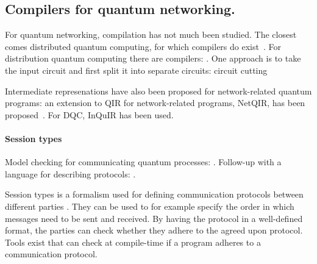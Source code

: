 


\subsection{Compilers for quantum networking.}
For quantum networking, compilation has not much been studied.
The closest comes distributed quantum computing, for which compilers do exist~\cite{ferrari_compiler_2021, chatterjee_qurzon_2022, cuomo_optimized_2023, ferrari_modular_2023}.
For distribution quantum computing there are compilers: \cite{ferrari_compiler_2021, haner_distributed_2021, cuomo_optimized_2023, ferrari_modular_2023}.
One approach is to take the input circuit and first split it into separate circuits: circuit cutting~\cite{chatterjee_qurzon_2022}

Intermediate represenations have also been proposed for network-related quantum programs:
an extension to QIR for network-related programs, NetQIR, has been proposed~\cite{vazquez-perez_netqir_2024}.
For DQC, InQuIR has been used.


\paragraph{Session types}
Model checking for communicating quantum processes: \cite{davidson_model_nodate}.
Follow-up with a language for describing protocols: \cite{ardeshir-larijani_automated_2018}.

Session types is a formalism used for defining communication protocols between different parties \cite{honda_language_1998}.
They can be used to for example specify the order in which messages need to be sent and received.
By having the protocol in a well-defined format, the parties can check whether they adhere to the agreed upon protocol.
Tools exist that can check at compile-time if a program adheres to a communication protocol.

